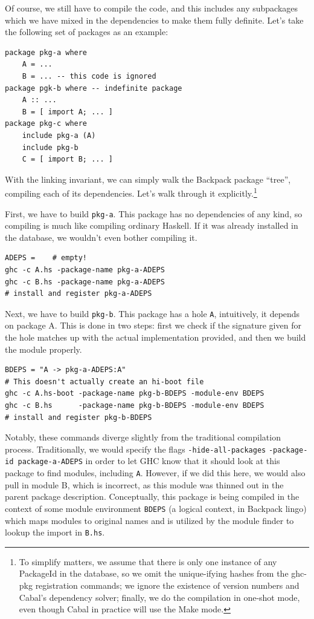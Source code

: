 \documentclass{article}
\begin{document}
Of course, we still have to compile the code, and this includes any
subpackages which we have mixed in the dependencies to make them fully
definite.  Let's take the following set of packages as an example:

\begin{verbatim}
package pkg-a where
    A = ...
    B = ... -- this code is ignored
package pgk-b where -- indefinite package
    A :: ...
    B = [ import A; ... ]
package pkg-c where
    include pkg-a (A)
    include pkg-b
    C = [ import B; ... ]
\end{verbatim}

With the linking invariant, we can simply walk the Backpack package ``tree'',
compiling each of its dependencies.  Let's walk through it explicitly.\footnote{To simplify matters, we assume that there is only one instance of any
PackageId in the database, so we omit the unique-ifying hashes from the
ghc-pkg registration commands; we ignore the existence of version numbers
and Cabal's dependency solver; finally, we do the compilation in
one-shot mode, even though Cabal in practice will use the Make mode.}

First, we have to build \verb|pkg-a|.  This package has no dependencies
of any kind, so compiling is much like compiling ordinary Haskell.  If
it was already installed in the database, we wouldn't even bother compiling it.

\begin{verbatim}
ADEPS =    # empty!
ghc -c A.hs -package-name pkg-a-ADEPS
ghc -c B.hs -package-name pkg-a-ADEPS
# install and register pkg-a-ADEPS
\end{verbatim}

Next, we have to build \verb|pkg-b|.  This package has a hole \verb|A|,
intuitively, it depends on package A.  This is done in two steps:
first we check if the signature given for the hole matches up with the
actual implementation provided, and then we build the module properly.

\begin{verbatim}
BDEPS = "A -> pkg-a-ADEPS:A"
# This doesn't actually create an hi-boot file
ghc -c A.hs-boot -package-name pkg-b-BDEPS -module-env BDEPS
ghc -c B.hs      -package-name pkg-b-BDEPS -module-env BDEPS
# install and register pkg-b-BDEPS
\end{verbatim}

Notably, these commands diverge slightly from the traditional compilation process.
Traditionally, we would specify the flags
\verb|-hide-all-packages| \verb|-package-id package-a-ADEPS| in order to
let GHC know that it should look at this package to find modules,
including \verb|A|.  However, if we did this here, we would also pull in
module B, which is incorrect, as this module was thinned out in the parent
package description.  Conceptually, this package is being compiled in the
context of some module environment \verb|BDEPS| (a logical context, in Backpack lingo)
which maps modules to original names and is utilized by the module finder to
lookup the import in \verb|B.hs|.
\end{document}
